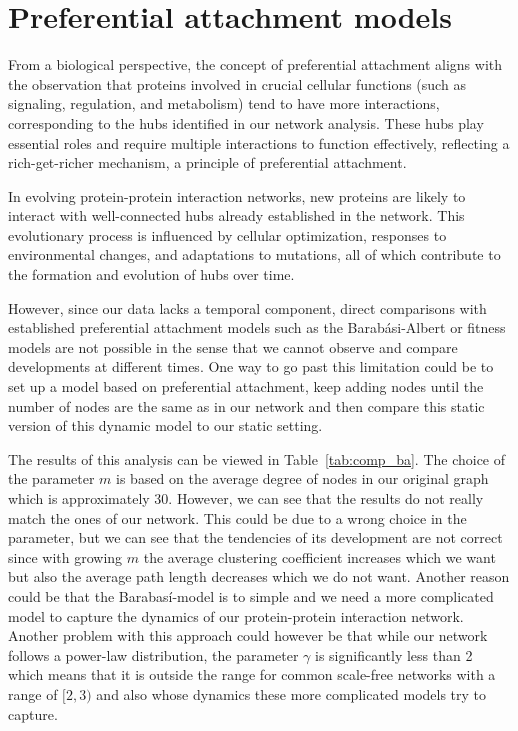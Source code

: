\documentclass[paper=a4,fontsize=11pt,DIV=8,BCOR=5mm,oneside,pdftex,bibtotocnumbered]{scrreprt}
\theoremstyle{plain}
\begin{document}
	\section{Preferential attachment models}
	From a biological perspective, the concept of preferential attachment aligns with the observation that proteins involved in crucial cellular functions (such as signaling, regulation, and metabolism) tend to have more interactions, corresponding to the hubs identified in our network analysis. These hubs play essential roles and require multiple interactions to function effectively, reflecting a rich-get-richer mechanism, a principle of preferential attachment.
	
	In evolving protein-protein interaction networks, new proteins are likely to interact with well-connected hubs already established in the network. This evolutionary process is influenced by cellular optimization, responses to environmental changes, and adaptations to mutations, all of which contribute to the formation and evolution of hubs over time. 
	
	However, since our data lacks a temporal component, direct comparisons with established preferential attachment models such as the Barabási-Albert or fitness models are not possible in the sense that we cannot observe and compare developments at different times. One way to go past this limitation could be to set up a model based on preferential attachment, keep adding nodes until the number of nodes are the same as in our network and then compare this static version of this dynamic model to our static setting.
	
	The results of this analysis can be viewed in Table~\ref{tab:comp_ba}. The choice of the parameter $m$ is based on the average degree of nodes in our original graph which is approximately 30. However, we can see that the results do not really match the ones of our network. This could be due to a wrong choice in the parameter, but we can see that the tendencies of its development are not correct since with growing $m$ the average clustering coefficient increases which we want but also the average path length decreases which we do not want. Another reason could be that the Barabasí-model is to simple and we need a more complicated model to capture the dynamics of our protein-protein interaction network. Another problem with this approach could however be that while our network follows a power-law distribution, the parameter $\gamma$ is significantly less than 2 which means that it is outside the range for common scale-free networks with a range of $[2, 3)$ and also whose dynamics these more complicated models try to capture.
	
\end{document}
